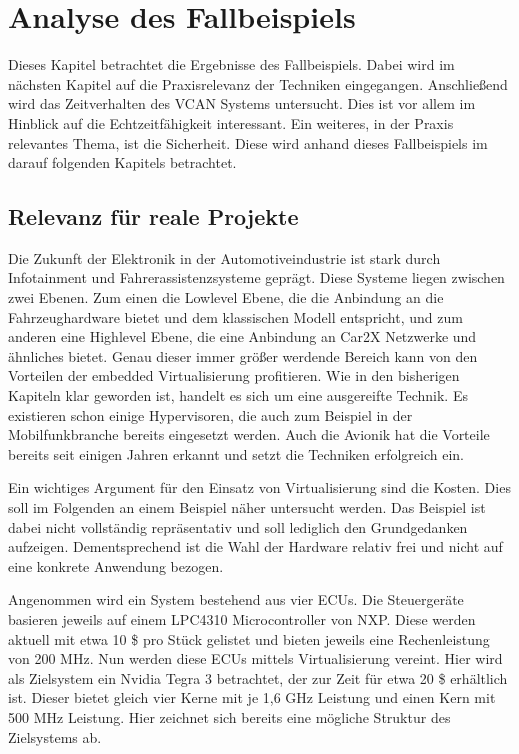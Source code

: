 \documentclass[
  a4paper,					    %
  twoside,
  DIV=calc,     				%
  bibliography=totoc,
  cleardoublepage=empty,
  ngerman,     					%
  final       					%
]{scrbook}
\begin{document}
\chapter{Analyse des Fallbeispiels}
\label{sec:Beispiel_Analyse}
Dieses Kapitel betrachtet die Ergebnisse des Fallbeispiels. Dabei wird im nächsten Kapitel auf die Praxisrelevanz der Techniken eingegangen. Anschließend wird das Zeitverhalten des VCAN Systems untersucht. Dies ist vor allem im Hinblick auf die Echtzeitfähigkeit interessant. Ein weiteres, in der Praxis relevantes Thema, ist die Sicherheit. Diese wird anhand dieses Fallbeispiels im darauf folgenden Kapitels betrachtet.



\section{Relevanz für reale Projekte}
\label{sec:Relevanz}
Die Zukunft der Elektronik in der Automotiveindustrie ist stark durch Infotainment und Fahrerassistenzsysteme geprägt. Diese Systeme liegen zwischen zwei Ebenen. Zum einen die Lowlevel Ebene, die die Anbindung an die Fahrzeughardware bietet und dem klassischen Modell entspricht, und zum anderen eine Highlevel Ebene, die eine Anbindung an Car2X Netzwerke und ähnliches bietet. Genau dieser immer größer werdende Bereich kann von den Vorteilen der embedded Virtualisierung profitieren. Wie in den bisherigen Kapiteln klar geworden ist, handelt es sich um eine ausgereifte Technik. Es existieren schon einige Hypervisoren, die auch zum Beispiel in der Mobilfunkbranche bereits eingesetzt werden. Auch die Avionik hat die Vorteile bereits seit einigen Jahren erkannt und setzt die Techniken erfolgreich ein.

Ein wichtiges Argument für den Einsatz von Virtualisierung sind die Kosten. Dies soll im Folgenden an einem Beispiel näher untersucht werden. Das Beispiel ist dabei nicht vollständig repräsentativ und soll lediglich den Grundgedanken aufzeigen. Dementsprechend ist die Wahl der Hardware relativ frei und nicht auf eine konkrete Anwendung bezogen.

Angenommen wird ein System bestehend aus vier ECUs. Die Steuergeräte basieren jeweils auf einem LPC4310 Microcontroller von NXP. Diese werden aktuell mit etwa 10 \$ pro Stück gelistet und bieten jeweils eine Rechenleistung von 200 MHz. Nun werden diese ECUs mittels Virtualisierung vereint. Hier wird als Zielsystem ein Nvidia Tegra 3 betrachtet, der zur Zeit für etwa 20 \$ erhältlich ist. Dieser bietet gleich vier Kerne mit je 1,6 GHz Leistung und einen Kern mit 500 MHz Leistung. Hier zeichnet sich bereits eine mögliche Struktur des Zielsystems ab. 
\end{document}
